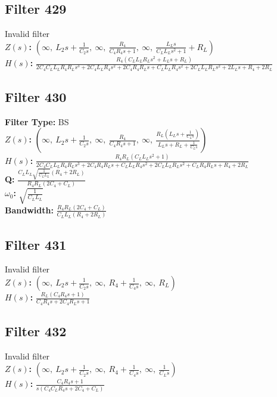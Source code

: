 \documentclass{article}
\begin{document}
\subsection*{Filter 429}
Invalid filter \\ 
\textbf{$Z(s)$:} $\left( \infty, \  L_{2} s + \frac{1}{C_{2} s}, \  \infty, \  \frac{R_{4}}{C_{4} R_{4} s + 1}, \  \infty, \  \frac{L_{L} s}{C_{L} L_{L} s^{2} + 1} + R_{L}\right)$ \\ 
\textbf{$H(s)$:} $\frac{R_{4} \left(C_{L} L_{L} R_{L} s^{2} + L_{L} s + R_{L}\right)}{2 C_{4} C_{L} L_{L} R_{4} R_{L} s^{3} + 2 C_{4} L_{L} R_{4} s^{2} + 2 C_{4} R_{4} R_{L} s + C_{L} L_{L} R_{4} s^{2} + 2 C_{L} L_{L} R_{L} s^{2} + 2 L_{L} s + R_{4} + 2 R_{L}}$ \\ 
\subsection*{Filter 430}
\textbf{Filter Type:} BS \\ 
\textbf{$Z(s)$:} $\left( \infty, \  L_{2} s + \frac{1}{C_{2} s}, \  \infty, \  \frac{R_{4}}{C_{4} R_{4} s + 1}, \  \infty, \  \frac{R_{L} \left(L_{L} s + \frac{1}{C_{L} s}\right)}{L_{L} s + R_{L} + \frac{1}{C_{L} s}}\right)$ \\ 
\textbf{$H(s)$:} $\frac{R_{4} R_{L} \left(C_{L} L_{L} s^{2} + 1\right)}{2 C_{4} C_{L} L_{L} R_{4} R_{L} s^{3} + 2 C_{4} R_{4} R_{L} s + C_{L} L_{L} R_{4} s^{2} + 2 C_{L} L_{L} R_{L} s^{2} + C_{L} R_{4} R_{L} s + R_{4} + 2 R_{L}}$ \\ 
\textbf{Q:} $\frac{C_{L} L_{L} \sqrt{\frac{1}{C_{L} L_{L}}} \left(R_{4} + 2 R_{L}\right)}{R_{4} R_{L} \left(2 C_{4} + C_{L}\right)}$ \\ 
\textbf{$\omega_0$:} $\sqrt{\frac{1}{C_{L} L_{L}}}$ \\ 
\textbf{Bandwidth:} $\frac{R_{4} R_{L} \left(2 C_{4} + C_{L}\right)}{C_{L} L_{L} \left(R_{4} + 2 R_{L}\right)}$ \\ 
\subsection*{Filter 431}
Invalid filter \\ 
\textbf{$Z(s)$:} $\left( \infty, \  L_{2} s + \frac{1}{C_{2} s}, \  \infty, \  R_{4} + \frac{1}{C_{4} s}, \  \infty, \  R_{L}\right)$ \\ 
\textbf{$H(s)$:} $\frac{R_{L} \left(C_{4} R_{4} s + 1\right)}{C_{4} R_{4} s + 2 C_{4} R_{L} s + 1}$ \\ 
\subsection*{Filter 432}
Invalid filter \\ 
\textbf{$Z(s)$:} $\left( \infty, \  L_{2} s + \frac{1}{C_{2} s}, \  \infty, \  R_{4} + \frac{1}{C_{4} s}, \  \infty, \  \frac{1}{C_{L} s}\right)$ \\ 
\textbf{$H(s)$:} $\frac{C_{4} R_{4} s + 1}{s \left(C_{4} C_{L} R_{4} s + 2 C_{4} + C_{L}\right)}$ \\ 
\end{document}
